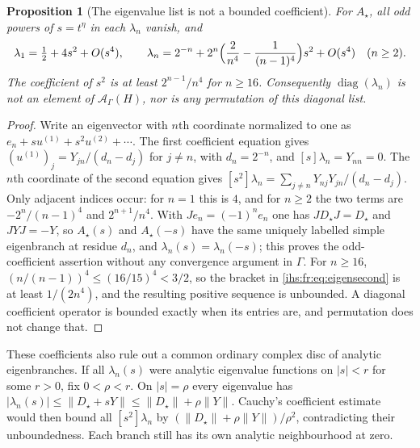 \documentclass[11pt,a4paper]{article}
\numberwithin{equation}{section}
\newtheorem{proposition}[proposition]{Proposition}
\theoremstyle{definition}
\theoremstyle{remark}
\newcommand{\Ahh}{\mathcal A_\Gamma(H)}
\newcommand{\diag}{\operatorname{diag}}
\newcommand{\norm}[1]{\lVert#1\rVert}
\begin{document}
\begin{proposition}[The eigenvalue list is not a bounded coefficient]\label{ihs:fr:prop:eigencoeff}
For $A_\star$, all odd powers of $s=t^\eta$ in each $\lambda_n$ vanish, and
\begin{equation}\label{ihs:fr:eq:eigensecond}
 \lambda_1=\tfrac12+4s^2+O(s^4),\qquad
 \lambda_n=2^{-n}+2^n\Bigl(\frac2{n^4}-\frac1{(n-1)^4}\Bigr)s^2+O(s^4)
 \quad(n\ge2).
\end{equation}
The coefficient of $s^2$ is at least $2^{n-1}/n^4$ for $n\ge16$.
Consequently $\diag(\lambda_n)$ is not an element of $\Ahh$, nor is any
permutation of this diagonal list.
\end{proposition}
\begin{proof}
Write an eigenvector with $n$th coordinate normalized to one as
$e_n+su^{(1)}+s^2u^{(2)}+\cdots$. The first coefficient equation gives
$(u^{(1)})_j=Y_{jn}/(d_n-d_j)$ for $j\ne n$, with $d_n=2^{-n}$, and
$[s]\lambda_n=Y_{nn}=0$. The $n$th coordinate of the second equation gives
$[s^2]\lambda_n=\sum_{j\ne n}Y_{nj}Y_{jn}/(d_n-d_j)$. Only adjacent indices
occur: for $n=1$ this is $4$, and for $n\ge2$ the two terms are
$-2^n/(n-1)^4$ and $2^{n+1}/n^4$. With $Je_n=(-1)^ne_n$ one has
$JD_\star J=D_\star$ and $JYJ=-Y$, so $A_\star(s)$ and $A_\star(-s)$ have the
same uniquely labelled simple eigenbranch at residue $d_n$, and
$\lambda_n(s)=\lambda_n(-s)$; this proves the odd-coefficient assertion
without any convergence argument in $\Gamma$. For $n\ge16$,
$(n/(n-1))^4\le(16/15)^4<3/2$, so the bracket in \eqref{ihs:fr:eq:eigensecond}
is at least $1/(2n^4)$, and the resulting positive sequence is unbounded. A
diagonal coefficient operator is bounded exactly when its entries are, and
permutation does not change that.
\end{proof}

These coefficients also rule out a common ordinary complex disc of analytic
eigenbranches. If all $\lambda_n(s)$ were analytic eigenvalue functions on
$|s|<r$ for some $r>0$, fix $0<\rho<r$. On $|s|=\rho$ every eigenvalue has
$|\lambda_n(s)|\le\norm{D_\star+sY}\le\norm{D_\star}+\rho\norm Y$.
Cauchy's coefficient estimate would then bound all $[s^2]\lambda_n$ by
$(\norm{D_\star}+\rho\norm Y)/\rho^2$, contradicting their unboundedness.
Each branch still has its own analytic neighbourhood at zero.
\end{document}
